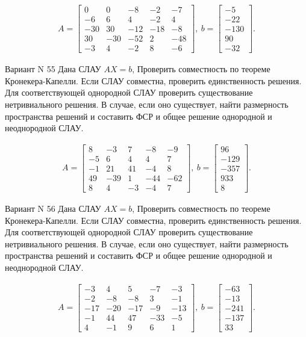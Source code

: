 \documentclass[11pt]{report}
\begin{document}
\begin{align*}
 A = \left[\begin{matrix}0 & 0 & -8 & -2 & -7\\-6 & 6 & 4 & -2 & 4\\-30 & 30 & -12 & -18 & -8\\30 & -30 & -52 & 2 & -48\\-3 & 4 & -2 & 8 & -6\end{matrix}\right],
\ b = \left[\begin{matrix}-5\\-22\\-130\\90\\-32\end{matrix}\right]. 
 \end{align*}

Вариант N 55
Дана СЛАУ $AX = b$,
Проверить совместность по теореме Кронекера-Капелли. Если СЛАУ совместна, проверить единственность решения.
Для соответствующей однородной СЛАУ проверить существование нетривиального решения. В случае, если оно существует,
найти размерность пространства решений и составить ФСР и общее решение однородной  и неоднородной СЛАУ.


\begin{align*}
 A = \left[\begin{matrix}8 & -3 & 7 & -8 & -9\\-5 & 6 & 4 & 4 & 7\\-1 & 21 & 41 & -4 & 8\\49 & -39 & 1 & -44 & -62\\8 & 4 & -3 & -4 & 7\end{matrix}\right],
\ b = \left[\begin{matrix}96\\-129\\-357\\933\\8\end{matrix}\right]. 
 \end{align*}

Вариант N 56
Дана СЛАУ $AX = b$,
Проверить совместность по теореме Кронекера-Капелли. Если СЛАУ совместна, проверить единственность решения.
Для соответствующей однородной СЛАУ проверить существование нетривиального решения. В случае, если оно существует,
найти размерность пространства решений и составить ФСР и общее решение однородной  и неоднородной СЛАУ.


\begin{align*}
 A = \left[\begin{matrix}-3 & 4 & 5 & -7 & -3\\-2 & -8 & -8 & 3 & -1\\-17 & -20 & -17 & -9 & -13\\-1 & 44 & 47 & -33 & -5\\4 & -1 & 9 & 6 & 1\end{matrix}\right],
\ b = \left[\begin{matrix}-63\\-13\\-241\\-137\\33\end{matrix}\right]. 
 \end{align*}
\end{document}
